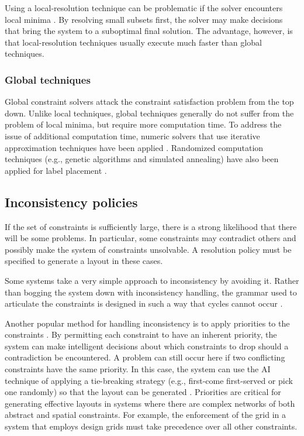		Using a local-resolution technique can be problematic if the solver
		encounters local minima \citep{borning-2}. By resolving small subsets
		first, the solver may make decisions that bring the system to a suboptimal
		final solution. The advantage, however, is that local-resolution techniques
		usually execute much faster than global techniques.

    \subsubsection{Global techniques}

		Global constraint solvers attack the constraint satisfaction problem from
		the top down. Unlike local techniques, global techniques generally do not
		suffer from the problem of local minima, but require more computation time.
		To address the issue of additional computation time, numeric solvers that
		use iterative approximation techniques have been applied
		\citep{kurlander-1}. Randomized computation techniques (e.g., genetic
		algorithms and simulated annealing) have also been applied for label
		placement \citep{christensen-2}.

    \subsection{Inconsistency policies}

		If the set of constraints is sufficiently large, there is a strong
		likelihood that there will be some problems. In particular, some
		constraints may contradict others and possibly make the system of
		constraints unsolvable. A resolution policy must be specified to generate a
		layout in these cases.

		Some systems take a very simple approach to inconsistency by avoiding it.
		Rather than bogging the system down with inconsistency handling, the
		grammar used to articulate the constraints is designed in such a way that
		cycles cannot occur \citep{weitzman-2}.

		Another popular method for handling inconsistency is to apply priorities to
		the constraints \citep{graf-1}. By permitting each constraint to have an
		inherent priority, the system can make intelligent decisions about which
		constraints to drop should a contradiction be encountered. A problem can
		still occur here if two conflicting constraints have the same priority. In
		this case, the system can use the AI technique of applying a tie-breaking
		strategy (e.g., first-come first-served or pick one randomly) so that the
		layout can be generated \citep{nilsson-1}. Priorities are critical for
		generating effective layouts in systems where there are complex networks of
		both abstract and spatial constraints. For example, the enforcement of the
		grid in a system that employs design grids must take precedence over all
		other constraints.

